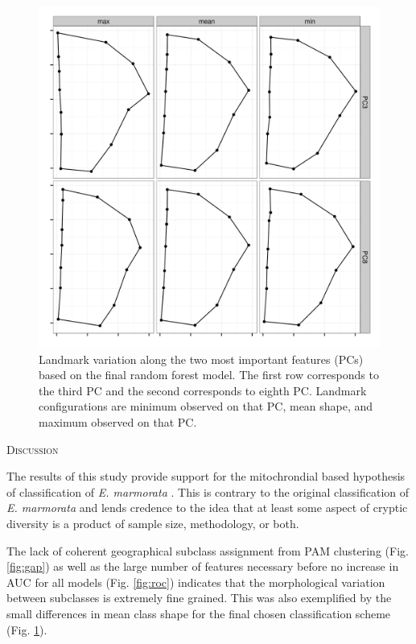 \documentclass[12pt,letterpaper]{article}\usepackage{graphicx, color}
\renewcommand{\section}[1]{%
\bigskip
\begin{center}
\begin{Large}
\normalfont\scshape #1
\medskip
\end{Large}
\end{center}}
\begin{document}
\begin{figure}[ht]
  \centering
  \includegraphics[width = \textwidth]{figure/imp_var}
  \caption{Landmark variation along the two most important features (PCs) based on the final random forest model. The first row corresponds to the third PC and the second corresponds to eighth PC. Landmark configurations are minimum observed on that PC, mean shape, and maximum observed on that PC.}
  \label{fig:imp_var}
\end{figure}

\section{Discussion}
The results of this study provide support for the mitochrondial based hypothesis of classification of \textit{E. marmorata} \citep{Spinks2005,Spinks2010}. This is contrary to the original classification of \textit{E. marmorata} \citep{Seeliger1945} and lends credence to the idea that at least some aspect of cryptic diversity is a product of sample size, methodology, or both.


The lack of coherent geographical subclass assignment from PAM clustering (Fig. \ref{fig:gap}) as well as the large number of features necessary before no increase in AUC for all models (Fig. \ref{fig:roc}) indicates that the morphological variation between subclasses is extremely fine grained. This was also exemplified by the small differences in mean class shape for the final chosen classification scheme (Fig. \ref{fig:imp_var}).
\end{document}
